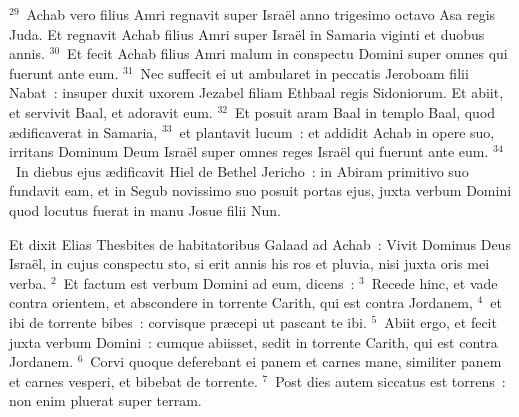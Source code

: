 ${}^{29}$~Achab vero filius Amri regnavit super Isra\"el anno trigesimo octavo Asa regis Juda. Et regnavit Achab filius Amri super Isra\"el in Samaria viginti et duobus annis.
${}^{30}$~Et fecit Achab filius Amri malum in conspectu Domini super omnes qui fuerunt ante eum.
${}^{31}$~Nec suffecit ei ut ambularet in peccatis Jeroboam filii Nabat~: insuper duxit uxorem Jezabel filiam Ethbaal regis Sidoniorum. Et abiit, et servivit Baal, et adoravit eum.
${}^{32}$~Et posuit aram Baal in templo Baal, quod \ae dificaverat in Samaria,
${}^{33}$~et plantavit lucum~: et addidit Achab in opere suo, irritans Dominum Deum Isra\"el super omnes reges Isra\"el qui fuerunt ante eum.
${}^{34}$~In diebus ejus \ae dificavit Hiel de Bethel Jericho~: in Abiram primitivo suo fundavit eam, et in Segub novissimo suo posuit portas ejus, juxta verbum Domini quod locutus fuerat in manu Josue filii Nun.

\bchapter
\lettrine[lines=3,image=true,loversize=0.05,lraise=-0.03]{E}{}t dixit Elias Thesbites de habitatoribus Galaad ad Achab~: Vivit Dominus Deus Isra\"el, in cujus conspectu sto, si erit annis his ros et pluvia, nisi juxta oris mei verba.
${}^{2}$~Et factum est verbum Domini ad eum, dicens~:
${}^{3}$~Recede hinc, et vade contra orientem, et abscondere in torrente Carith, qui est contra Jordanem,
${}^{4}$~et ibi de torrente bibes~: corvisque pr\ae cepi ut pascant te ibi.
${}^{5}$~Abiit ergo, et fecit juxta verbum Domini~: cumque abiisset, sedit in torrente Carith, qui est contra Jordanem.
${}^{6}$~Corvi quoque deferebant ei panem et carnes mane, similiter panem et carnes vesperi, et bibebat de torrente.
${}^{7}$~Post dies autem siccatus est torrens~: non enim pluerat super terram.



